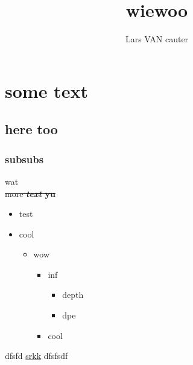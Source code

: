 \documentclass[a4paper,12pt]{article}
\author{Lars VAN cauter}
\begin{document}
\title{wiewoo}
\maketitle
\tableofcontents
\newpage
\section{some text}
\subsection{here too}
\subsubsection{subsubs}
wat
 \\ 
\sout{more \textbf{\textit{text} yu}}
 \\ 
\begin{itemize}
\item test
\item cool
\begin{itemize}
\item wow
\begin{itemize}
\item inf
\begin{itemize}
\item depth
\item dpe
\end{itemize}
\item cool
\end{itemize}
\end{itemize}
\end{itemize}
dfsfd \href{https://beaversinfos.weebly.com/}{srkk} dfsfsdf
 \\ 
\end{document}
